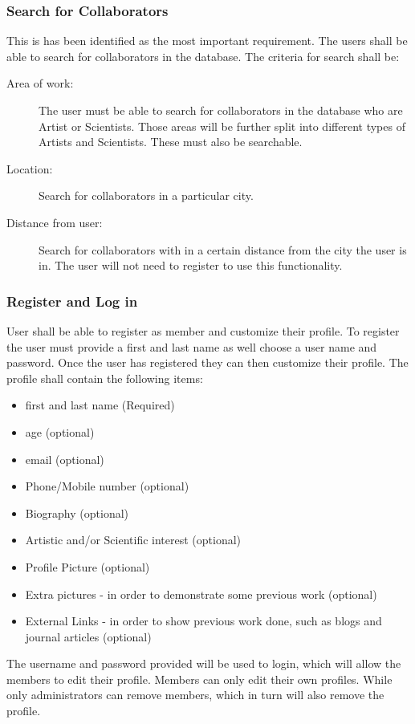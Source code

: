 \documentclass[a4paper,oneside,11pt]{report}
\begin{document}
\subsubsection{Search for Collaborators} 
This is has been identified as the most important requirement. The users shall be able to search for collaborators in the database. The criteria for search shall be:
\begin{description}
	\item[Area of work:] The user must be able to search for collaborators in the database who are Artist or Scientists. Those areas will be further split into different types of Artists and Scientists. These must also be searchable.
	\item[Location:] Search for collaborators in a particular city.
	\item[Distance from user:] Search for collaborators with in a certain distance from the city the user is in. The user will not need to register to use this functionality.
\end{description}
	
\subsubsection{Register and Log in} 
 User shall be able to register as member and customize their profile. To register the user must provide a first and last name as well choose a user name and password. Once the user has registered they can then customize their profile. The profile shall contain the following items:
 \begin{itemize}
 \item first and last name (Required)
 \item age (optional)
 \item email (optional)
 \item Phone/Mobile number (optional)
 \item Biography (optional)
 \item Artistic and/or Scientific interest (optional)
 \item Profile Picture (optional)
 \item Extra pictures - in order to demonstrate some previous work (optional)
 \item External Links - in order to show previous work done, such as blogs and journal articles (optional)
 \end{itemize}
 The username and password provided will be used to login, which will allow the members to edit their profile.
 	Members can only edit their own profiles. While only administrators can remove members, which in turn will also remove the profile.
\end{document}
